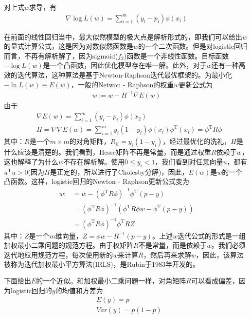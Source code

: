             对上式$w$求导，有
            \begin{align*}
            \nabla \log L(w) = \sum_{i=1}^m (y_i-p_i)\phi(x_i)
            \end{align*}
            \par
            在前面的线性回归当中，最大似然模型的极大点是解析形式的，即我们可以给出$w$的显式计算公式，这是因为对数似然函数是$w$的一个二次函数。但是对logistic回归而言，不再有解析解了，因为sigmoid($f_2$)函数是一个非线性函数。目标函数$-\log L(w)$是一个凸函数，因此优化模型存在唯一解。此外，对于$w$还有一种高效的迭代算法，这种算法是基于Newton-Raphson迭代最优框架的。为最小化$-\ln L(w) \equiv E(w)$，一般的Netwon - Raphson的权重$w$更新公式为
            \begin{align*}
            w:= w-H^{-1}\nabla E(w)
            \end{align*}
            由于
            \begin{align*}
            & \nabla E(w) = \sum_{i=1}^m(y_i-p_i)\phi(x_2)\\
            & H = \nabla\nabla E(w) = \sum_{i=1}^m y_i(1-y_i)\phi(x_i)\phi^\mathrm{T}(x_i) = \phi^\mathrm{T}R\phi
            \end{align*}
            其中：$R$是一个$m\times m$的对角矩阵，$R_{ii} = y_i(1-y_i)$，经过最优化的洗礼，$H$是什么应该是清楚的。我们看到，Hesse矩阵不再是常量，而是通过权重$R$依赖于$w$，这也解释了为什么$w$不存在解析解。使用$0 \leqslant y_i < 1$，我们看到对任意向量$u$，都有$u^\mathrm{T}u>0$(因为$H$是正定的，所以进行了Cholesby分解)，因此，$E(w)$是$w$的一个凸函数。这样，logistic回归的Newton - Raphson更新公式变为
            \begin{align*}
            w:&=w-(\phi^\mathrm{T}R\phi)^{-1}\phi^{\mathrm{T}}(p-y)\\
            &= (\phi^\mathrm{T}R \phi)^{-1}(\phi^\mathrm{T}R\phi w - \phi^\mathrm{T}(p-y))\\
            &=(\phi^\mathrm{T}R\phi)^{-1}\phi^\mathrm{T}RZ
            \end{align*}
            其中：$Z$是一个$m$维向量，$Z = \phi w - R^{-1}(p-y)$。上述$w$迭代公式的形式是一组加权最小二乘问题的规范方程。由于权矩阵$R$不是常量，而是依赖于$w$。我们必须迭代地应用规范方程，每次使用新的$w$来计算$R$，然后再来求解$w$，因此，该算法被称为迭代加权最小平方算法(IRLS)，是Rubin于1983年开发的。
            \par
            下面给出$E$的一个近似。和加权最小二乘问题一样，对角矩阵$R$可以看成偏差，因为logistic回归的$y$的均值和方差为
            \begin{align*}
            &E(y) = p\\
            &Var(y) =p(1-p)
            \end{align*}
